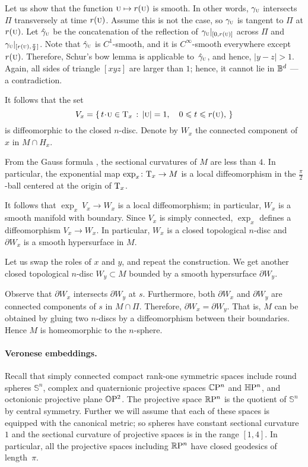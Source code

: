 \documentclass[a4paper,10pt]{article}
\begin{document}
Let us show that the function ${{\normalfont\textsc{u}}}\mapsto r({{\normalfont\textsc{u}}})$ is smooth.
In other words, $\gamma_{{\normalfont\textsc{u}}}$ intersects $\Pi$ transversely at time $r({{\normalfont\textsc{u}}})$.
Assume this is not the case, so $\gamma_{{\normalfont\textsc{u}}}$ is tangent to $\Pi$ at $r({{\normalfont\textsc{u}}})$.
Let $\hat\gamma_{{\normalfont\textsc{u}}}$ be the concatenation of the reflection of $\gamma_{{\normalfont\textsc{u}}}|_{[0,r({{\normalfont\textsc{u}}})]}$ across $\Pi$ and $\gamma_{{\normalfont\textsc{u}}}|_{[r({{\normalfont\textsc{u}}}),\frac\pi2]}$.
Note that $\hat \gamma_{{\normalfont\textsc{u}}}$ is $C^1$-smooth, and it is $C^\infty$-smooth everywhere except $r({{\normalfont\textsc{u}}})$.
Therefore, Schur's bow lemma is applicable to~$\hat \gamma_{{\normalfont\textsc{u}}}$, and hence, $|y-z|>1$.
Again, all sides of triangle $[xyz]$ are larger than $1$;
hence, it cannot lie in $\mathbb{B}^d$ --- a contradiction.  

It follows that the set 
\[V_x=\set{t\cdot {\mathsc{u}}\in \T_x}{|{\mathsc{u}}|=1,\quad 0\le t\le r({\mathsc{u}}),}\]
is diffeomorphic to the closed $n$-disc.
Denote by $W_x$ the connected component of $x$ in $M\cap H_x$.

From the Gauss formula \cite[Lemma 5]{petrunin2024}, the sectional curvatures of $M$ are less than $4$.
In particular, the exponential map $\exp_x\colon\mathrm{T}_x\to M$ is a local diffeomorphism in the $\tfrac\pi2$-ball centered at the origin of $\mathrm{T}_x$.

It follows that $\exp_x\:V_x\to W_x$ is a local diffeomorphism;
in particular, $W_x$ is a smooth manifold with boundary.
Since $V_x$ is simply connected, $\exp_x$ defines a diffeomorphism $V_x\to W_x$.
In particular, $W_x$ is a closed topological $n$-disc and $\partial W_x$ is a smooth hypersurface in $M$.

Let us swap the roles of $x$ and $y$, and repeat the construction.
We get another closed topological $n$-disc $W_y\subset M$ bounded by a smooth hypersurface $\partial W_y$.

Observe that $\partial W_x$ intersects $\partial W_y$ at $s$.
Furthermore, both $\partial W_x$ and $\partial W_y$ are connected components of $s$ in $M\cap \Pi$.
Therefore, $\partial W_x=\partial W_y$.
That is, $M$ can be obtained by gluing two $n$-discs by a diffeomorphism between their boundaries.
Hence $M$ is homeomorphic to the $n$-sphere.
\qeds

\paragraph{Veronese embeddings.}\label{veronese}
Recall that simply connected compact rank-one symmetric spaces include round spheres $\mathbb{S}^n$, complex and quaternionic projective spaces $\mathbb{C}\mathrm{P}^n$ and $\mathbb{H}\mathrm{P}^n$, and octonionic projective plane $\mathbb{O}\mathrm{P}^2$.
The projective space $\mathbb{R}\mathrm{P}^n$ is the quotient of $\mathbb{S}^n$ by central symmetry.
Further we will assume that each of these spaces is equipped with the canonical metric;
so spheres have constant sectional curvature $1$ and the sectional curvature of projective spaces is in the range $[1,4]$.
In particular, all the projective spaces including $\mathbb{R}\mathrm{P}^n$ have closed geodesics of length~$\pi$.
\end{document}
